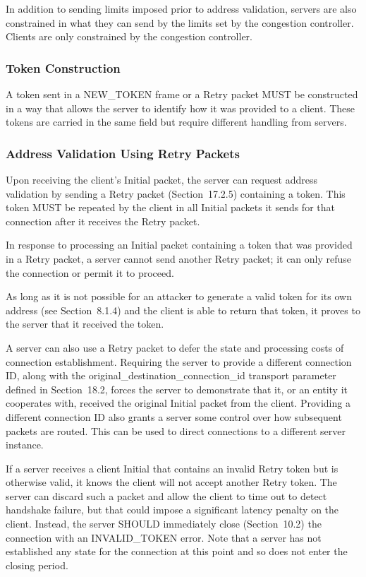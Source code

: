 \documentclass{article}
\begin{document}
In addition to sending limits imposed prior to address validation, servers are also constrained in what they can send by the limits set by the congestion controller.  Clients are only constrained by the congestion controller.

\subsubsection{Token Construction}

A token sent in a NEW\_TOKEN frame or a Retry packet MUST be constructed in a way that allows the server to identify how it was provided to a client.  These tokens are carried in the same field but require different handling from servers.

\subsubsection{Address Validation Using Retry Packets}

Upon receiving the client's Initial packet, the server can request address validation by sending a Retry packet (Section~17.2.5) containing a token.  This token MUST be repeated by the client in all Initial packets it sends for that connection after it receives the Retry packet.

In response to processing an Initial packet containing a token that was provided in a Retry packet, a server cannot send another Retry packet; it can only refuse the connection or permit it to proceed.

As long as it is not possible for an attacker to generate a valid token for its own address (see Section~8.1.4) and the client is able to return that token, it proves to the server that it received the token.

A server can also use a Retry packet to defer the state and processing costs of connection establishment.  Requiring the server to provide a different connection ID, along with the original\_destination\_connection\_id transport parameter defined in Section~18.2, forces the server to demonstrate that it, or an entity it cooperates with, received the original Initial packet from the client.  Providing a different connection ID also grants a server some control over how subsequent packets are routed.  This can be used to direct connections to a different server instance.

If a server receives a client Initial that contains an invalid Retry token but is otherwise valid, it knows the client will not accept another Retry token.  The server can discard such a packet and allow the client to time out to detect handshake failure, but that could impose a significant latency penalty on the client.  Instead, the server SHOULD immediately close (Section~10.2) the connection with an INVALID\_TOKEN error.  Note that a server has not established any state for the connection at this point and so does not enter the closing period.
\end{document}

